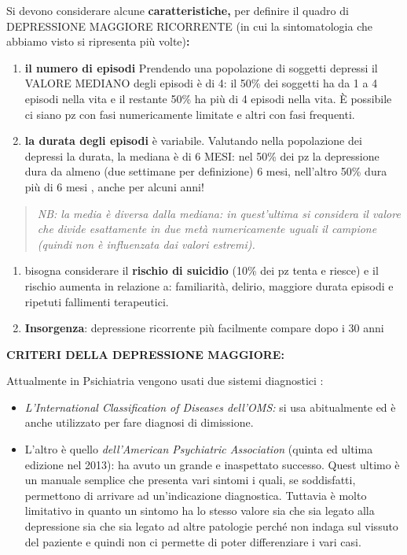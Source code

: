 \documentclass[]{article}
\begin{document}
Si devono considerare alcune \textbf{caratteristiche,} per definire il
quadro di DEPRESSIONE MAGGIORE RICORRENTE (in cui la sintomatologia che
abbiamo visto si ripresenta più volte)\textbf{:}

\begin{enumerate}
\def\labelenumi{\arabic{enumi}.}
\item
  \textbf{il numero di episodi} Prendendo una popolazione di soggetti
  depressi il VALORE MEDIANO degli episodi è di 4: il 50\% dei soggetti
  ha da 1 a 4 episodi nella vita e il restante 50\% ha più di 4 episodi
  nella vita. È possibile ci siano pz con fasi numericamente limitate e
  altri con fasi frequenti.
\item
  \textbf{la durata degli episodi} è variabile. Valutando nella
  popolazione dei depressi la durata, la mediana è di 6 MESI: nel 50\%
  dei pz la depressione dura da almeno (due settimane per definizione) 6
  mesi, nell'altro 50\% dura più di 6 mesi , anche per alcuni anni!
\end{enumerate}

\begin{quote}
\emph{NB: la media è diversa dalla mediana: in quest'ultima si considera
il valore che divide esattamente in due metà numericamente uguali il
campione (quindi non è influenzata dai valori estremi).}
\end{quote}

\begin{enumerate}
\def\labelenumi{\arabic{enumi}.}
\item
  bisogna considerare il \textbf{rischio di suicidio} (10\% dei pz tenta
  e riesce) e il rischio aumenta in relazione a: familiarità, delirio,
  maggiore durata episodi e ripetuti fallimenti terapeutici.
\item
  \textbf{Insorgenza}: depressione ricorrente più facilmente compare
  dopo i 30 anni
\end{enumerate}

\textbf{CRITERI DELLA DEPRESSIONE MAGGIORE:}

Attualmente in Psichiatria vengono usati due sistemi diagnostici :

\begin{itemize}
\item
  \emph{\emph{L'International Classification of Diseases dell'OMS:}} si
  usa abitualmente ed è anche utilizzato per fare diagnosi di
  dimissione.
\item
  L'altro è quello \emph{\emph{dell'American Psychiatric Association}}
  (quinta ed ultima edizione nel 2013): ha avuto un grande e inaspettato
  successo. Quest ultimo è un manuale semplice che presenta vari sintomi
  i quali, se soddisfatti, permettono di arrivare ad un'indicazione
  diagnostica. Tuttavia è molto limitativo in quanto un sintomo ha lo
  stesso valore sia che sia legato alla depressione sia che sia legato
  ad altre patologie perché non indaga sul vissuto del paziente e quindi
  non ci permette di poter differenziare i vari casi.
\end{itemize}
\end{document}
